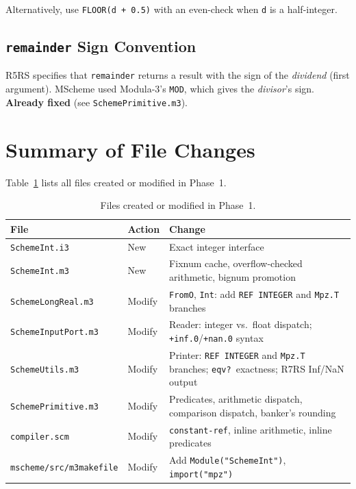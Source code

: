 \documentclass[12pt]{article}
\begin{document}
\noindent Alternatively, use {\tt FLOOR(d + 0.5)} with an even-check
when {\tt d} is a half-integer.

\subsection{{\tt remainder} Sign Convention}

R5RS specifies that {\tt remainder} returns a result with the sign
of the \emph{dividend} (first argument).  MScheme used Modula-3's
{\tt MOD}, which gives the \emph{divisor}'s sign.
\textbf{Already fixed} (see {\tt SchemePrimitive.m3}).

\section{Summary of File Changes}
\label{sec:impl-summary}

Table~\ref{tab:files} lists all files created or modified in Phase~1.

\begin{table}[htbp]
\centering
\begin{tabular}{llp{6cm}}
\toprule
\textbf{File} & \textbf{Action} & \textbf{Change} \\
\midrule
{\tt SchemeInt.i3} & New & Exact integer interface \\
{\tt SchemeInt.m3} & New & Fixnum cache, overflow-checked
  arithmetic, bignum promotion \\
{\tt SchemeLongReal.m3} & Modify & {\tt FromO}, {\tt Int}:
  add {\tt REF INTEGER} and {\tt Mpz.T} branches \\
{\tt SchemeInputPort.m3} & Modify & Reader: integer vs.\ float
  dispatch; {\tt +inf.0}/{\tt +nan.0} syntax \\
{\tt SchemeUtils.m3} & Modify & Printer: {\tt REF INTEGER} and
  {\tt Mpz.T} branches; {\tt eqv?}\ exactness;
  R7RS Inf/NaN output \\
{\tt SchemePrimitive.m3} & Modify & Predicates, arithmetic
  dispatch, comparison dispatch, banker's rounding \\
{\tt compiler.scm} & Modify & {\tt constant-ref}, inline
  arithmetic, inline predicates \\
{\tt mscheme/src/m3makefile} & Modify & Add {\tt Module("SchemeInt")},
  {\tt import("mpz")} \\
\bottomrule
\end{tabular}
\caption{Files created or modified in Phase~1.}
\label{tab:files}
\end{table}
\end{document}
